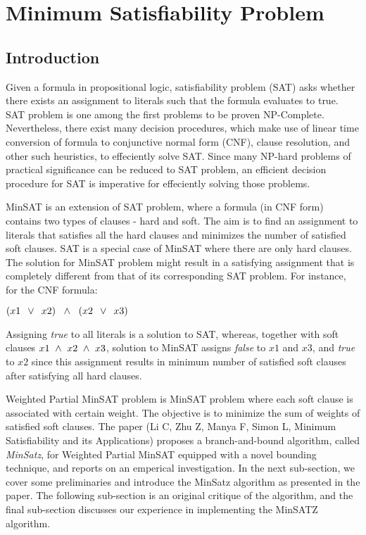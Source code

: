 \section{Minimum Satisfiability Problem}
\label{sec:minsat}

\subsection{Introduction}
Given a formula in propositional logic, satisfiability problem (SAT) asks
whether there exists an assignment to literals such that the formula evaluates
to true. SAT problem is one among the first problems to be proven NP-Complete.
Nevertheless, there exist many decision procedures, which make use of linear
time conversion of formula to conjunctive normal form (CNF), clause resolution,
and other such heuristics, to effeciently solve SAT.  Since many NP-hard
problems of practical significance can be reduced to SAT problem, an efficient
decision procedure for SAT is imperative for effeciently solving those problems.

MinSAT is an extension of SAT problem, where a formula (in CNF form) contains
two types of clauses - hard and soft. The aim is to find an assignment to
literals that satisfies all the hard clauses and minimizes the number of
satisfied soft clauses. SAT is a special case of MinSAT where there are only
hard clauses. The solution for MinSAT problem might result in a satisfying
assignment that is completely different from that of its corresponding SAT
problem. For instance, for the CNF formula:
\begin{center}
  \(
    (x1 \, ~\vee~ \, x2) \; ~\wedge~ \; (x2 \, ~\vee~ \, x3)
 \)
\end{center}
Assigning \emph{true} to all literals is a solution to SAT, whereas, together
with soft clauses $x1 ~\wedge~ x2 ~\wedge~ x3$, solution to MinSAT assigns
\emph{false} to $x1$ and $x3$, and \emph{true} to $x2$ since this assignment
results in minimum number of satisfied soft clauses after satisfying all hard
clauses.

Weighted Partial MinSAT problem is MinSAT problem where each soft clause is
associated with certain weight. The objective is to minimize the sum of weights
of satisfied soft clauses. The paper (Li C, Zhu Z, Manya F, Simon L, Minimum Satisfiability and its
Applications) proposes a branch-and-bound
algorithm, called \emph{MinSatz}, for Weighted Partial MinSAT equipped with a
novel bounding technique, and reports on an emperical investigation. In the next
sub-section, we cover some preliminaries and introduce the MinSatz algorithm as
presented in the paper. The following sub-section is an original critique of the
algorithm, and the final sub-section discusses our experience in implementing
the MinSATZ algorithm.

